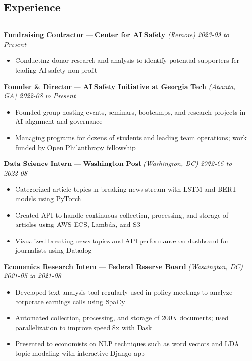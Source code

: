 \documentclass[10pt]{article}
\newcommand{\resumeHeading}[1]{
    \subsection*{#1}
    \hrule
    \vspace*{5pt}
}
\newcommand{\resumeSubHeading}[5]{
    \vspace*{5pt}
    \textbf{#1} — \textbf{#2} \textsl{(#3) \hfill #4 to #5}
}
\begin{document}

\resumeHeading{Experience \vspace{-2.5pt}}

\resumeSubHeading
    {Fundraising Contractor}
    {Center for AI Safety}
    {Remote}
    {2023-09}
    {Present}
\begin{itemize}
    \item Conducting donor research and analysis to identify potential supporters for leading AI safety non-profit
\end{itemize}

\resumeSubHeading
    {Founder \& Director}
    {AI Safety Initiative at Georgia Tech}
    {Atlanta, GA}
    {2022-08}
    {Present}
\begin{itemize}
    \item Founded group hosting events, seminars, bootcamps, and research projects in AI alignment and governance
    \item Managing programs for dozens of students and leading team operations; work funded by Open Philanthropy fellowship
\end{itemize}


\resumeSubHeading
    {Data Science Intern}
    {Washington Post}
    {Washington, DC}
    {2022-05}
    {2022-08}
\begin{itemize}
    \item Categorized article topics in breaking news stream with LSTM and BERT models using PyTorch
    \item Created API to handle continuous collection, processing, and storage of articles using AWS ECS, Lambda, and S3
    \item Visualized breaking news topics and API performance on dashboard for journalists using Datadog
\end{itemize}

\resumeSubHeading
    {Economics Research Intern}
    {Federal Reserve Board}
    {Washington, DC}
    {2021-05}
    {2021-08}
\begin{itemize}
    \item Developed text analysis tool regularly used in policy meetings to analyze corporate earnings calls using SpaCy
    \item Automated collection, processing, and storage of 200K documents; used parallelization to improve speed 8x with Dask
    \item Presented to economists on NLP techniques such as word vectors and LDA topic modeling with interactive Django app
\end{itemize}
\end{document}
